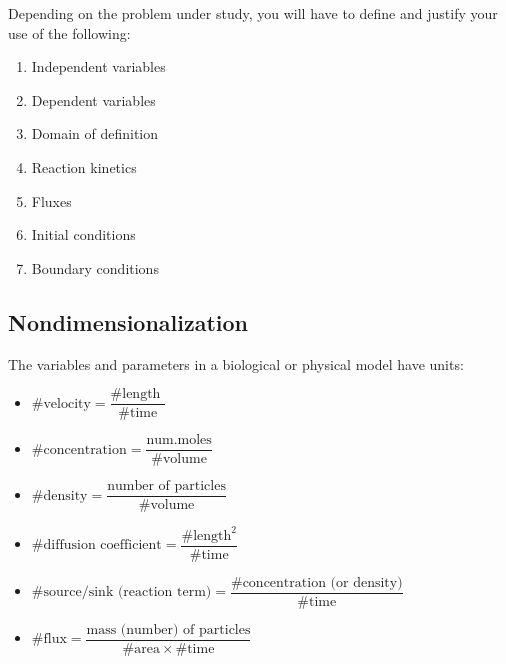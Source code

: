 \documentclass[
  letterpaper,
  DIV=11,
  numbers=noendperiod]{scrreprt}
\providecommand{\tightlist}{%
  \setlength{\itemsep}{0pt}\setlength{\parskip}{0pt}}\usepackage{longtable,booktabs,array}
\theoremstyle{plain}
\theoremstyle{definition}
\theoremstyle{plain}
\theoremstyle{remark}
\begin{document}
\begin{tcolorbox}[enhanced jigsaw, colback=white, colframe=quarto-callout-note-color-frame, toprule=.15mm, bottomrule=.15mm, left=2mm, leftrule=.75mm, bottomtitle=1mm, opacitybacktitle=0.6, breakable, rightrule=.15mm, titlerule=0mm, colbacktitle=quarto-callout-note-color!10!white, title=\textcolor{quarto-callout-note-color}{\faInfo}\hspace{0.5em}{Checklist}, arc=.35mm, coltitle=black, toptitle=1mm, opacityback=0]

Depending on the problem under study, you will have to define and
justify your use of the following:

\begin{enumerate}
\def\labelenumi{\arabic{enumi}.}
\tightlist
\item
  Independent variables
\item
  Dependent variables
\item
  Domain of definition
\item
  Reaction kinetics
\item
  Fluxes
\item
  Initial conditions
\item
  Boundary conditions
\end{enumerate}

\end{tcolorbox}

\hypertarget{nondimensionalization}{%
\subsection{Nondimensionalization}\label{nondimensionalization}}

The variables and parameters in a biological or physical model have
units:

\begin{itemize}
\tightlist
\item
  \(\#\textrm{velocity} = \dfrac{\#\text{length }}{\#\text{time}}\)
\item
  \(\# \textrm{concentration} = \dfrac{ \text{num.moles}}{\#\text{volume}}\)
\item
  \(\#\text{density} = \dfrac{\text{number of particles}}{\# \text{volume}}\)
\item
  \(\#\text{diffusion coefficient} = \dfrac{\#\text{length}^2}{\#\text{time}}\)
\item
  \(\#\text{source/sink (reaction term)} = \dfrac{\#\text{concentration (or density)}}{\#\text{time}}\)
\item
  \(\#\text{flux} = \dfrac{\text{mass (number) of particles}}{\#\text{area} \times \# \text{time}}\)
\end{itemize}
\end{document}
